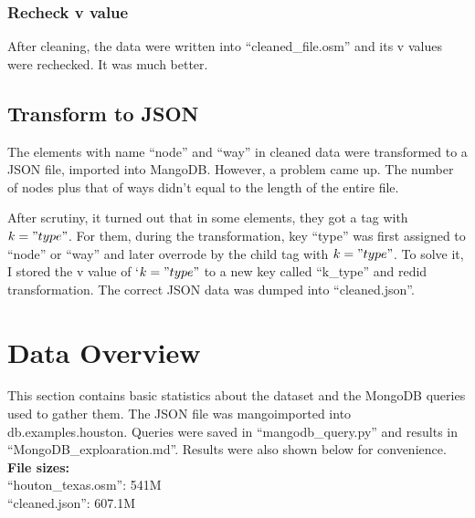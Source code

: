 \documentclass[12pt]{article}
\begin{document}
\subsubsection{Recheck v value}
After cleaning, the data were written into ``cleaned\_file.osm'' and its v values were rechecked. It was much better.

\subsection{Transform to JSON}
The elements with name ``node'' and ``way'' in cleaned data were transformed to a JSON file, imported into MangoDB. However, a problem came up. The number of nodes plus that of ways didn't equal to the length of the entire file.

After scrutiny, it turned out that in some elements, they got a tag with $k="type"$. For them, during the transformation, key ``type'' was first assigned to ``node'' or ``way'' and later overrode by the child tag with $k="type"$. To solve it, I stored the v value of `$k="type"$ to a new key called ``k\_type'' and redid transformation. The correct JSON data was dumped into ``cleaned.json''.

\section{Data Overview}
This section contains basic statistics about the dataset and the MongoDB queries used to gather them. The JSON file was mangoimported into db.examples.houston. Queries were saved in ``mangodb\_query.py'' and results in ``MongoDB\_exploaration.md''. Results were also shown below for convenience.\\
\textbf{File sizes:}\\
``houton\_texas.osm'': 541M\\
``cleaned.json'': 607.1M
\end{document}
